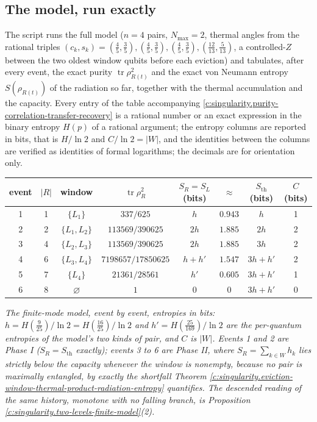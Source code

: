 \documentclass[11pt]{article}
\theoremstyle{definition}
\theoremstyle{plain}
\providecommand{\Sth}{}\renewcommand{\Sth}{S_{\mathrm{th}}}
\providecommand{\tr}{}\renewcommand{\tr}{\operatorname{tr}}
\begin{document}
\subsection*{The model, run exactly}
\label{c:note.singularity.setting-model-run-exactly}
The script runs the full model ($n = 4$ pairs, $N_{\max} = 2$, thermal angles from the rational triples $(c_k, s_k) = (\tfrac45, \tfrac35), (\tfrac45, \tfrac35), (\tfrac45, \tfrac35), (\tfrac{12}{13}, \tfrac{5}{13})$, a controlled-$Z$ between the two oldest window qubits before each eviction) and tabulates, after every event, the exact purity $\tr\rho_{R(t)}^{2}$ and the exact von Neumann entropy $S(\rho_{R(t)})$ of the radiation so far, together with the thermal accumulation and the capacity. Every entry of the table accompanying \ref{c:singularity.purity-correlation-transfer-recovery} is a rational number or an exact expression in the binary entropy $H(p)$ of a rational argument; the entropy columns are reported in bits, that is $H/\ln 2$ and $C/\ln 2 = |W|$, and the identities between the columns are verified as identities of formal logarithms; the decimals are for orientation only.

 \begin{tabular}{cccccccc}
\toprule
event & $|R|$ & window & $\tr\rho_R^{2}$ & $S_R = S_L$ (bits) & $\approx$ & $\Sth$ (bits) & $C$ (bits) \\
\midrule
1 & 1 & $\{L_1\}$ & $337/625$ & $h$ & $0.943$ & $h$ & 1 \\
2 & 2 & $\{L_1, L_2\}$ & $113569/390625$ & $2h$ & $1.885$ & $2h$ & 2 \\
3 & 4 & $\{L_2, L_3\}$ & $113569/390625$ & $2h$ & $1.885$ & $3h$ & 2 \\
4 & 6 & $\{L_3, L_4\}$ & $7198657/17850625$ & $h + h'$ & $1.547$ & $3h + h'$ & 2 \\
5 & 7 & $\{L_4\}$ & $21361/28561$ & $h'$ & $0.605$ & $3h + h'$ & 1 \\
6 & 8 & $\varnothing$ & $1$ & $0$ & $0$ & $3h + h'$ & 0 \\
\bottomrule
\end{tabular}

\emph{The finite-mode model, event by event, entropies in bits: $h = H(\tfrac{9}{25})/\ln 2 = H(\tfrac{16}{25})/\ln 2$ and $h' = H(\tfrac{25}{169})/\ln 2$ are the per-quantum entropies of the model's two kinds of pair, and $C$ is $|W|$. Events 1 and 2 are Phase I ($S_R = \Sth$ exactly); events 3 to 6 are Phase II, where $S_R = \sum_{k \in W}h_k$ lies strictly below the capacity whenever the window is nonempty, because no pair is maximally entangled, by exactly the shortfall Theorem \ref{c:singularity.eviction-window-thermal-product-radiation-entropy} quantifies. The descended reading of the same history, monotone with no falling branch, is Proposition \ref{c:singularity.two-levels-finite-model}(2).}
\end{document}
